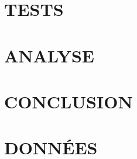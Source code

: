 \documentclass[livre]{udes-genie-these}
\begin{document}
\chapter{TESTS}

\chapter{ANALYSE}

\chapter{CONCLUSION}

\appendix

\chapter{DONNÉES}
\end{document}
